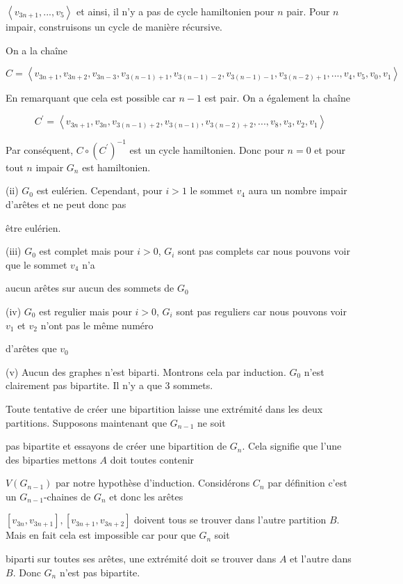 \documentclass{article}
\newcommand{\tuple}[1]{\ensuremath{\left\langle #1 \right\rangle}}
\begin{document}
$\tuple{v_{3n+1},...,v_5}$ et ainsi, il n'y a pas de cycle hamiltonien pour $n$ pair.
Pour $n$ impair, construisons un cycle de manière récursive. 

On a la chaîne

$$C = \tuple{v_{3n + 1},v_{3n + 2},v_{3n - 3},v_{3(n-1) + 1},v_{3(n-1) - 2},v_{3(n-1) - 1},v_{3(n-2) + 1}, ... , v_4,v_5,v_0,v_1}$$

En remarquant que cela est possible car $n-1$ est pair. On a également la chaîne 

$$C^{\prime} = \tuple{v_{3n+1},v_{3n},v_{3(n-1) + 2},v_{3(n-1)},v_{3(n-2) + 2}, ...,v_8, v_3,v_2,v_1}$$

Par conséquent, $C \circ (C^{\prime})^{-1}$ est un cycle hamiltonien. Donc pour $n = 0$ et pour tout $n$ impair $G_n$ est hamiltonien.

\vspace{0.2cm}

(ii) $G_0$ est eulérien. Cependant, pour $i>1$  le sommet $v_4$ aura un nombre impair d'arêtes et ne peut donc pas 

être eulérien.
\vspace{0.2cm}

(iii) $G_0$ est complet mais pour $i > 0$, $G_i$ sont pas complets car nous pouvons voir que le sommet $v_4$ n'a 

aucun arêtes sur aucun des sommets de $G_0$
\vspace{0.2cm}

(iv) $G_0$ est regulier mais pour $i > 0$, $G_i$ sont pas reguliers car nous pouvons voir $v_1$ et $v_2$  n'ont pas le même numéro 

d'arêtes que $v_0$
\vspace{0.2cm}

(v) Aucun des graphes n'est biparti. Montrons cela par induction. $G_0$ n'est clairement pas bipartite. Il n'y a que 3 sommets. 

Toute tentative de créer une bipartition laisse une extrémité dans les deux partitions. Supposons maintenant que $G_{n-1}$ ne soit 

pas bipartite et essayons de créer une bipartition de $G_n$. Cela signifie que l'une des biparties mettons $A$ doit toutes contenir 

$V(G_{n-1})$ par notre hypothèse d'induction. Considérons $C_{n}$ par définition c'est un $G_{n-1}$-chaines de $G_{n}$ et donc les arêtes 

$[v_{3n},v_{3n+ 1}],[v_{3n+1},v_{3n+2}]$ doivent tous se trouver dans l'autre partition $B$. Mais en fait cela est impossible car pour que $G_n$ soit 

biparti sur toutes ses arêtes, une extrémité doit se trouver dans $A$ et l'autre dans $B$. Donc $G_n$ n'est pas bipartite.
\end{document}
